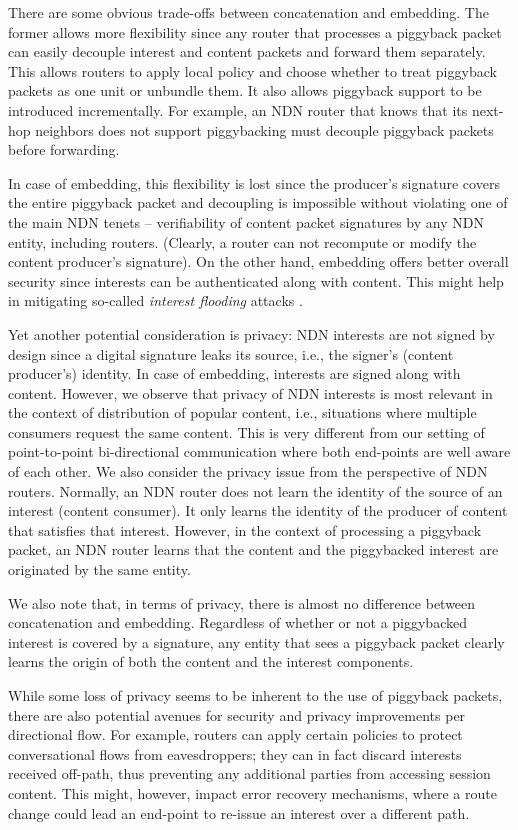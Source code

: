 \documentclass[conference]{IEEEtran}
\begin{document}
There are some obvious trade-offs between concatenation and embedding. 
The former allows more flexibility since any router that processes a piggyback packet 
can easily decouple interest and content packets and forward them separately. 
This allows routers to apply local policy and choose whether to treat piggyback packets
as one unit or unbundle them. It also allows piggyback support to be introduced incrementally.
For example, an NDN router that knows that its next-hop neighbors does not support piggybacking 
must decouple piggyback packets before forwarding.

In case of embedding, this flexibility is lost since the producer's signature covers the
entire piggyback packet and decoupling is impossible without violating one of the main
NDN tenets -- verifiability of content packet signatures by any NDN entity, including routers.
(Clearly, a router can not recompute or modify the content producer's signature).
On the other hand, embedding offers better overall security since interests can be authenticated
along with content. This might help in mitigating so-called {\em interest flooding} attacks \cite{ndn-dos}.

Yet another potential consideration is privacy: NDN interests are not signed by design since a 
digital signature leaks its source, i.e., the signer's (content producer's) identity. In case of 
embedding, interests
are signed along with content. However, we observe that privacy of NDN interests is most
relevant in the context of distribution of popular content, i.e., situations where multiple
consumers request the same content. This is very different from our setting of point-to-point
bi-directional communication where both end-points are well aware of each other. 
We also consider the privacy issue from the perspective of NDN routers. Normally,
an NDN router does not learn the identity of the source of an interest (content consumer). 
It only learns the identity of the producer of content that satisfies that interest.
However, in the context of processing a piggyback packet,
an NDN router learns that the content and the piggybacked interest are originated by
the same entity. 

We also note that, in terms of privacy, there is almost no difference between concatenation 
and embedding. Regardless of whether or not a piggybacked interest is covered by a signature, 
any entity that sees a piggyback packet clearly learns the origin of both the content and the 
interest components.

While some loss of privacy seems to be inherent to the use of piggyback packets, 
there are also potential avenues for security and privacy improvements per directional flow. 
For example, routers can apply certain policies to protect conversational flows from 
eavesdroppers; they can in fact discard interests received off-path, thus preventing any 
additional parties from accessing session content. This might, however, impact 
error recovery mechanisms, where a route change could lead an end-point to re-issue 
an interest over a different path.
\end{document}
